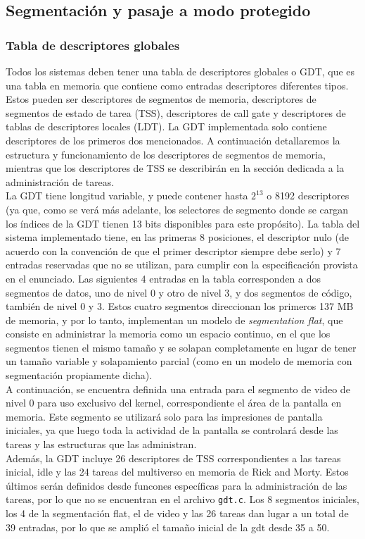 \documentclass[a4paper]{article}
\begin{document}
\subsection{Segmentación y pasaje a modo protegido}

\subsubsection{Tabla de descriptores globales}
Todos los sistemas deben tener una tabla de descriptores globales o GDT, que es una tabla en memoria que contiene como entradas descriptores diferentes tipos. Estos pueden ser descriptores de segmentos de memoria, descriptores de segmentos de estado de tarea (TSS), descriptores de call gate y descriptores de tablas de descriptores locales (LDT). La GDT implementada solo contiene descriptores de los primeros dos mencionados. A continuación detallaremos la estructura y funcionamiento de los descriptores de segmentos de memoria, mientras que los descriptores de TSS se describirán en la sección dedicada a la administración de tareas. \\
La GDT tiene longitud variable, y puede contener hasta $2^{13}$ o 8192 descriptores (ya que, como se verá más adelante, los selectores de segmento donde se cargan los índices de la GDT tienen 13 bits disponibles para este propósito). La tabla del sistema implementado tiene, en las primeras 8 posiciones, el descriptor nulo (de acuerdo con la convención de que el primer descriptor siempre debe serlo) y 7 entradas reservadas que no se utilizan, para cumplir con la especificación provista en el enunciado. Las siguientes 4 entradas en la tabla corresponden a dos segmentos de datos, uno de nivel 0 y otro de nivel 3, y dos segmentos de código, también de nivel 0 y 3. Estos cuatro segmentos direccionan los primeros 137 MB de memoria, y por lo tanto, implementan un modelo de \textit{segmentation flat}, que consiste en administrar la memoria como un espacio continuo, en el que los segmentos tienen el mismo tamaño y se solapan completamente en lugar de tener un tamaño variable y solapamiento parcial (como en un modelo de memoria con segmentación propiamente dicha). \\
A continuación, se encuentra definida una entrada para el segmento de video de nivel 0 para uso exclusivo del kernel, correspondiente el área de la pantalla en memoria. Este segmento se utilizará solo para las impresiones de pantalla iniciales, ya que luego toda la actividad de la pantalla se controlará desde las tareas y las estructuras que las administran. \\
Además, la GDT incluye 26 descriptores de TSS correspondientes a las tareas inicial, idle y las 24 tareas del multiverso en memoria de Rick and Morty. Estos últimos serán definidos desde funcones específicas para la administración de las tareas, por lo que no se encuentran en el archivo {\tt gdt.c}. Los 8 segmentos iniciales, los 4 de la segmentación flat, el de video y las 26 tareas dan lugar a un total de 39 entradas, por lo que se amplió el tamaño inicial de la gdt desde 35 a 50.
\end{document}

